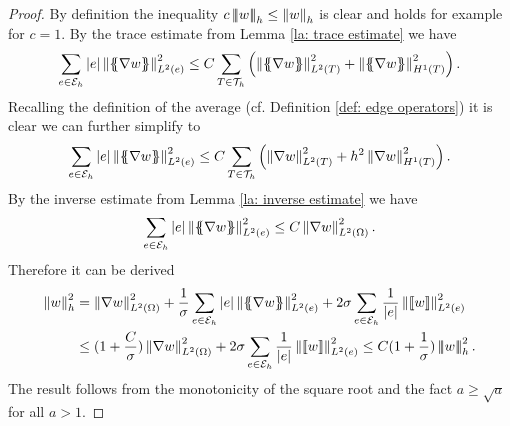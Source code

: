 \begin{proof}
	By definition the inequality $c \left| \! \left| \! \left| w \right| \! \right| \! \right|_{h} \leq \left\lVert w \right\rVert_{h}$ is clear and holds for example for $c=1$. 
	By the trace estimate from Lemma \ref{la: trace estimate} we have
	\begin{align*}
	\sum_{e \in \edges} \singleNorm e \LTwonormE{\average{\nabla w}}^2 
	\leq C \sum_{T \in \triang} \left( \LTwonormT{\average{\nabla w}}^2 +\HOnenormT{\average{\nabla w}}^2   \right).
	\end{align*}
	Recalling the definition of the average (cf. Definition \ref{def: edge operators}) it is clear we can further simplify to
	\begin{align}
	\sum_{e \in \mathcal{E}_h} \left| e \right| \left\lVert \{\!\!\{ \nabla w \}\!\!\} \right\rVert_{L^2(e)}^2 
	\leq C \sum_{T \in \mathcal{T}_h} \left( \left\lVert \nabla w \right\rVert_{L^2(T)}^2 +h^2 \left\lVert  \nabla w \right\rVert_{H^1(T)}^2   \right).\label{eq: estimate avg term}
	\end{align}
	By the inverse estimate from Lemma \ref{la: inverse estimate} we have 
	\begin{align}
	\sum_{e \in \mathcal{E}_h} \left| e \right|  \left\lVert \{\!\!\{ \nabla w \}\!\!\} \right\rVert_{L^2(e)}^2 \leq C \left\lVert \nabla w \right\rVert_{L^2(\Omega)}^2. \label{eq: estimate average}
	\end{align}
	Therefore it can be derived
	\begin{align*}
		\eNorm{w}^2 
		&= \LTwonorm{\nabla w}^2
			+ \frac 1 \sigma \sum_{e \in \edges} \singleNorm e \LTwonormE{\average{\nabla w}}^2  
			+ 2 \sigma \sum_{e \in \edges} \frac 1 {|e|} \LTwonormE{\jump{w}}^2 \\
		&\leq (1+\frac C \sigma) \LTwonorm{\nabla w}^2 
			+ 2 \sigma \sum_{e \in \edges} \frac 1 {|e|} \LTwonormE{\jump{w}}^2 
		\leq C(1+\frac 1 \sigma) \eNormTwo{w}^2.
	\end{align*}
The result follows from the monotonicity of the square root and the fact $a \geq \sqrt a$ for all $a > 1$.
\end{proof}

